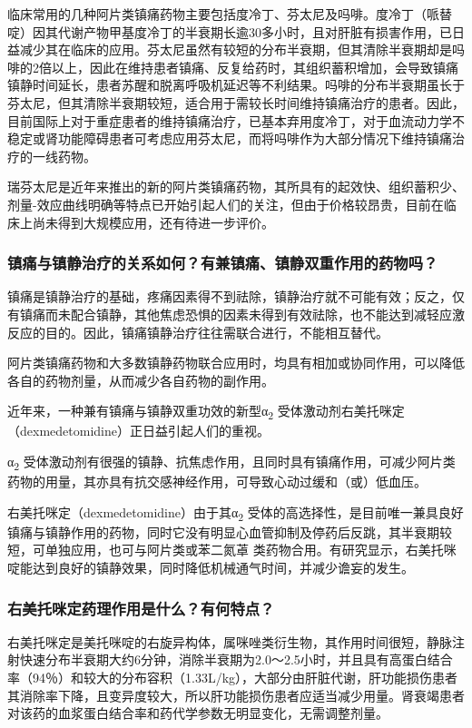 临床常用的几种阿片类镇痛药物主要包括度冷丁、芬太尼及吗啡。度冷丁（哌替啶）因其代谢产物甲基度冷丁的半衰期长逾30多小时，且对肝脏有损害作用，已日益减少其在临床的应用。芬太尼虽然有较短的分布半衰期，但其清除半衰期却是吗啡的2倍以上，因此在维持患者镇痛、反复给药时，其组织蓄积增加，会导致镇痛镇静时间延长，患者苏醒和脱离呼吸机延迟等不利结果。吗啡的分布半衰期虽长于芬太尼，但其清除半衰期较短，适合用于需较长时间维持镇痛治疗的患者。因此，目前国际上对于重症患者的维持镇痛治疗，已基本弃用度冷丁，对于血流动力学不稳定或肾功能障碍患者可考虑应用芬太尼，而将吗啡作为大部分情况下维持镇痛治疗的一线药物。

瑞芬太尼是近年来推出的新的阿片类镇痛药物，其所具有的起效快、组织蓄积少、剂量-效应曲线明确等特点已开始引起人们的关注，但由于价格较昂贵，目前在临床上尚未得到大规模应用，还有待进一步评价。

\subsubsection{镇痛与镇静治疗的关系如何？有兼镇痛、镇静双重作用的药物吗？}

镇痛是镇静治疗的基础，疼痛因素得不到祛除，镇静治疗就不可能有效；反之，仅有镇痛而未配合镇静，其他焦虑恐惧的因素未得到有效祛除，也不能达到减轻应激反应的目的。因此，镇痛镇静治疗往往需联合进行，不能相互替代。

阿片类镇痛药物和大多数镇静药物联合应用时，均具有相加或协同作用，可以降低各自的药物剂量，从而减少各自药物的副作用。

近年来，一种兼有镇痛与镇静双重功效的新型α\textsubscript{2}
受体激动剂右美托咪定（dexmedetomidine）正日益引起人们的重视。

α\textsubscript{2}
受体激动剂有很强的镇静、抗焦虑作用，且同时具有镇痛作用，可减少阿片类药物的用量，其亦具有抗交感神经作用，可导致心动过缓和（或）低血压。

右美托咪定（dexmedetomidine）由于其α\textsubscript{2}
受体的高选择性，是目前唯一兼具良好镇痛与镇静作用的药物，同时它没有明显心血管抑制及停药后反跳，其半衰期较短，可单独应用，也可与阿片类或苯二氮䓬
类药物合用。有研究显示，右美托咪啶能达到良好的镇静效果，同时降低机械通气时间，并减少谵妄的发生。

\subsubsection{右美托咪定药理作用是什么？有何特点？}

右美托咪定是美托咪啶的右旋异构体，属咪唑类衍生物，其作用时间很短，静脉注射快速分布半衰期大约6分钟，消除半衰期为2.0～2.5小时，并且具有高蛋白结合率（94％）和较大的分布容积（1.33L/kg），大部分由肝脏代谢，肝功能损伤患者其消除率下降，且变异度较大，所以肝功能损伤患者应适当减少用量。肾衰竭患者对该药的血浆蛋白结合率和药代学参数无明显变化，无需调整剂量。

